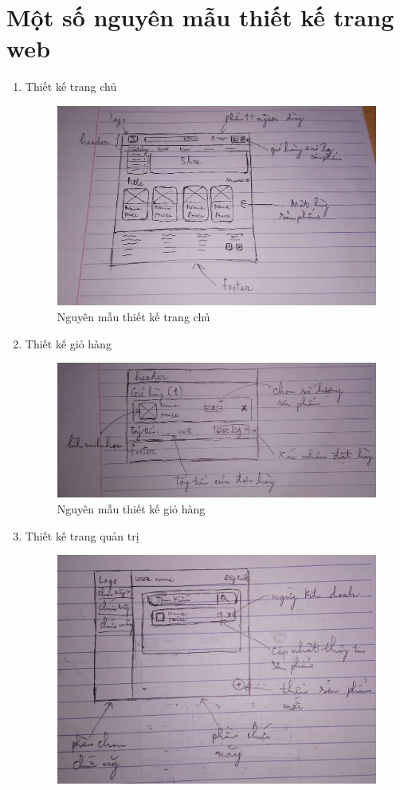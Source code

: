 \section{Một số nguyên mẫu thiết kế trang web}
\begin{enumerate}[label=\textbf{\alph*)}]
\item Thiết kế trang chủ
\begin{figure}[h!]
	\centering
	\includegraphics[width=\linewidth]{fig/p_home.jpg}
	\caption{Nguyên mẫu thiết kế trang chủ}
\end{figure}
\newpage
\item Thiết kế giỏ hàng
\begin{figure}[h!]
	\centering
	\includegraphics[width=\linewidth]{fig/p_cart.jpg}
	\caption{Nguyên mẫu thiết kế giỏ hàng}
\end{figure}
\item Thiết kế trang quản trị
\begin{figure}[h!]
	\centering
	\includegraphics[width=\linewidth]{fig/p_dashboard.jpg}

\end{figure}
\end{enumerate}
